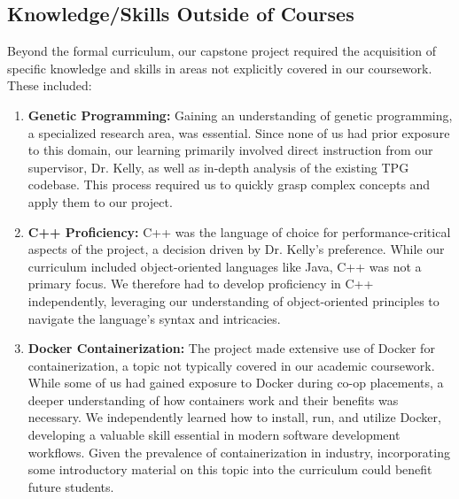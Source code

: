 \documentclass{article}
\begin{document}
\subsection{Knowledge/Skills Outside of Courses}

Beyond the formal curriculum, our capstone project required the acquisition of specific knowledge and skills in areas not explicitly covered in our coursework. These included:

\begin{enumerate}
    \item \textbf{Genetic Programming:} Gaining an understanding of genetic programming, a specialized research area, was essential. Since none of us had prior exposure to this domain, our learning primarily involved direct instruction from our supervisor, Dr. Kelly, as well as in-depth analysis of the existing TPG codebase. This process required us to quickly grasp complex concepts and apply them to our project.

    \item \textbf{C++ Proficiency:} C++ was the language of choice for performance-critical aspects of the project, a decision driven by Dr. Kelly's preference. While our curriculum included object-oriented languages like Java, C++ was not a primary focus. We therefore had to develop proficiency in C++ independently, leveraging our understanding of object-oriented principles to navigate the language's syntax and intricacies.

    \item \textbf{Docker Containerization:} The project made extensive use of Docker for containerization, a topic not typically covered in our academic coursework. While some of us had gained exposure to Docker during co-op placements, a deeper understanding of how containers work and their benefits was necessary. We independently learned how to install, run, and utilize Docker, developing a valuable skill essential in modern software development workflows. Given the prevalence of containerization in industry, incorporating some introductory material on this topic into the curriculum could benefit future students.
\end{enumerate}
\end{document}

